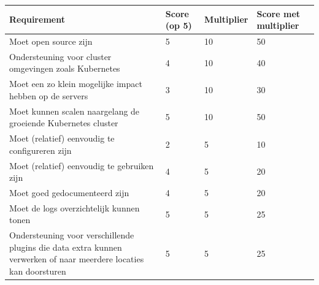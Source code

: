 \begin{table}[ht]
    \begin{tabular}{| m{20em} | m{2cm} | m{2cm} | m{2cm} | }
        \hline
        \textbf{Requirement}                                                                                              & \textbf{Score (op 5)} & \textbf{Multiplier} & \textbf{Score met multiplier} \\ \hline
        Moet open source zijn                                                                                             & 5                     & 10                  & 50                            \\ \hline
        Ondersteuning voor cluster omgevingen zoals Kubernetes                                                            & 4                     & 10                  & 40                            \\ \hline
        Moet een zo klein mogelijke impact hebben op de servers                                                           & 3                     & 10                  & 30                            \\ \hline
        Moet kunnen scalen naargelang de groeiende Kubernetes cluster                                                     & 5                     & 10                  & 50                            \\ \hline
        Moet (relatief) eenvoudig te configureren zijn                                                                    & 2                     & 5                   & 10                            \\ \hline
        Moet (relatief) eenvoudig te gebruiken zijn                                                                       & 4                     & 5                   & 20                            \\ \hline
        Moet goed gedocumenteerd zijn                                                                                     & 4                     & 5                   & 20                            \\ \hline
        Moet de logs overzichtelijk kunnen tonen                                                                          & 5                     & 5                   & 25                            \\ \hline
        Ondersteuning voor verschillende plugins die data extra kunnen verwerken of naar meerdere locaties kan doorsturen & 5                     & 5                   & 25                            \\ \hline

\end{tabular}
\end{table}
